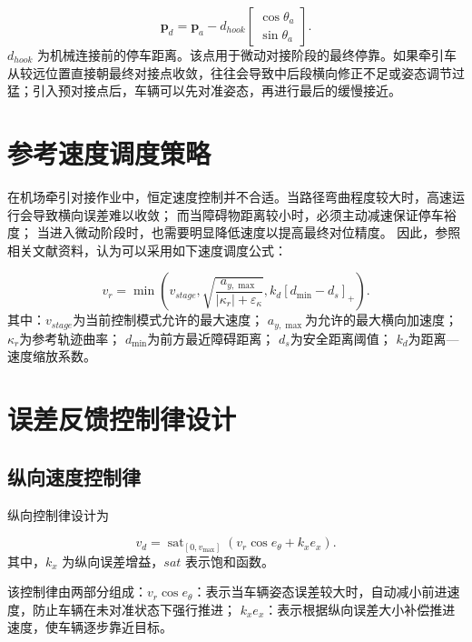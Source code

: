 \begin{equation}
\mathbf{p}_{d}=\mathbf{p}_{a}-d_{hook}
\begin{bmatrix}\cos\theta_a\\\sin\theta_a\end{bmatrix}.
\label{eq:docking_point}
\end{equation}
\(d_{hook}\)
为机械连接前的停车距离。该点用于微动对接阶段的最终停靠。如果牵引车从较远位置直接朝最终对接点收敛，往往会导致中后段横向修正不足或姿态调节过猛；引入预对接点后，车辆可以先对准姿态，再进行最后的缓慢接近\cite{ref20,ref21,ref26,ref27,ref28}。

\section{参考速度调度策略}

在机场牵引对接作业中，恒定速度控制并不合适。当路径弯曲程度较大时，高速运行会导致横向误差难以收敛；
而当障碍物距离较小时，必须主动减速保证停车裕度；
当进入微动阶段时，也需要明显降低速度以提高最终对位精度。
因此，参照相关文献资料，认为可以采用如下速度调度公式：

\begin{equation}
v_{r}=\min\left(v_{stage},\sqrt{\frac{a_{y,\max}}{|\kappa_r|+\varepsilon_\kappa}},k_d[d_{\min}-d_s]_+\right).
\label{eq:speed_schedule}
\end{equation}
其中：\(v_{stage}\)为当前控制模式允许的最大速度；
\(a_{y,\max}\)为允许的最大横向加速度； \(\kappa_{r}\)为参考轨迹曲率；
\(d_{\min}\)为前方最近障碍距离； \(d_{s}\)为安全距离阈值；
\(k_{d}\)为距离---速度缩放系数\cite{ref25,ref27,ref28}。

\section{误差反馈控制律设计}

\subsection{纵向速度控制律}

纵向控制律设计为

\begin{equation}
v_d=\operatorname{sat}_{[0,v_{\max}]}
\left(v_r\cos e_\theta+k_xe_x\right).
\label{eq:longitudinal_control}
\end{equation}
其中，\(k_{x}\) 为纵向误差增益，\(sat\) 表示饱和函数。

该控制律由两部分组成：\(v_{r}\cos e_{\theta}\)：表示当车辆姿态误差较大时，自动减小前进速度，防止车辆在未对准状态下强行推进；
\(k_{x}e_{x}\)：表示根据纵向误差大小补偿推进速度，使车辆逐步靠近目标。

